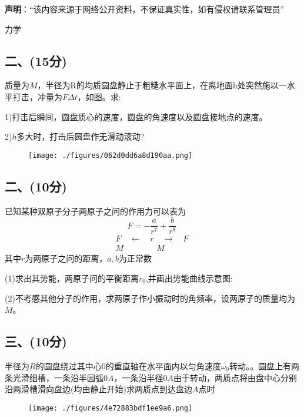 
\textbf{声明}：“该内容来源于网络公开资料，不保证真实性，如有侵权请联系管理员”

力学
\subsection{二、(15分)}
质量为$M$，半径为R的均质圆盘静止于粗糙水平面上，在离地面h处突然施以一水平打击，冲量为$F\Delta t$，如图。求:

1)打击后瞬间，圆盘质心的速度，圆盘的角速度以及圆盘接地点的速度。

2)$h$多大时，打击后圆盘作无滑动滚动?
\begin{figure}[ht]
\centering
\texttt{[image: ./figures/062d0dd6a8d190aa.png]}
\caption{} \label{fig_PKU199_1}
\end{figure}
\subsection{二、(10分)}
已知某种双原子分子两原子之问的作用力可以表为
$$F = -\frac{a}{r^7} + \frac{b}{r^8}~$$
$$\begin{array}{c}
F \quad \longleftarrow \quad r \quad \longrightarrow \quad F \\
M \quad \quad \quad \quad M 
\end{array}~$$
其中$r$为两原子之问的距离，$a,b$为正常数

(1)求出其势能，两原子问的平衡距离$r_0$,并画出势能曲线示意图:

(2)不考感其他分子的作用，求两原子作小振动时的角频率，设两原子的质量均为$M$。
\subsection{三、(10分)}
半径为$R$的圆盘绕过其中心$0$的重直轴在水平面内以匀角速度$\omega_0$转动。。圆盘上有两条光滑细槽，一条沿半园弧$0A$，一条沿半径$0A$由于转动，两质点将由盘中心分别沿两滑槽滑向盘边(均由静止开始)求两质点到达盘边$A$点时
\begin{figure}[ht]
\centering
\texttt{[image: ./figures/4e72883bdf1ee9a6.png]}
\caption{} \label{fig_PKU199_2}
\end{figure}
